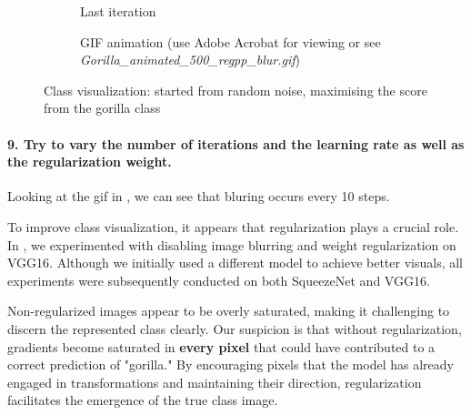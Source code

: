 \begin{figure}[H]
    \centering
    \begin{subfigure}{.5\textwidth}
        \centering
        \caption{Last iteration}
        \label{fig:class_viz_gorilla:png}
    \end{subfigure}%
    \begin{subfigure}{.5\textwidth}
        \centering
        \caption{GIF animation (use Adobe Acrobat for viewing or see \textit{Gorilla\_animated\_500\_regpp\_blur.gif})}
        \label{fig:class_viz_gorilla:gif}
    \end{subfigure}

    \caption{Class visualization: started from random noise, maximising the score from the gorilla class}
    \label{fig:class_viz_gorilla}
\end{figure}

\paragraph*{9. Try to vary the number of iterations and the learning rate as well as the regularization weight.}
Looking at the gif in , we can see that bluring occurs every 10 steps. 

To improve class visualization, it appears that regularization plays a crucial role. In , we experimented with disabling image blurring and weight regularization on VGG16. Although we initially used a different model to achieve better visuals, all experiments were subsequently conducted on both SqueezeNet and VGG16.


Non-regularized images appear to be overly saturated, making it challenging to discern the represented class clearly. Our suspicion is that without regularization, gradients become saturated in \textbf{every pixel} that could have contributed to a correct prediction of "gorilla." By encouraging pixels that the model has already engaged in transformations and maintaining their direction, regularization facilitates the emergence of the true class image.

